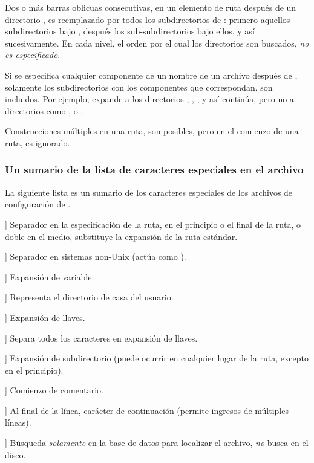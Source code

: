 \documentclass{article}
\begin{document}
Dos o más barras oblicuas consecutivas, en un elemento de ruta después
de un directorio , es reemplazado por todos los subdirectorios
de : primero aquellos subdirectorios bajo , después los
sub-subdirectorios bajo ellos, y así sucesivamente. En cada nivel, el
orden por el cual los directorios son buscados, \emph{no es
especificado}.

Si se especifica cualquier componente de un nombre de un archivo
después de \samp{//}, solamente los subdirectorios con los componentes
que correspondan, son incluidos. Por ejemplo,  expande a
los directorios , , , y así
continúa, pero no a directorios como , o .

Construcciones múltiples \samp{//} en una ruta, son posibles, pero
\samp{//} en el comienzo de una ruta, es ignorado. 

\subsubsection{Un sumario de la lista de caracteres especiales en el archivo }
\label{sec:cnf-special-chars}

La siguiente lista es un sumario de los caracteres especiales de los
archivos de configuración de \KPS{}.

\newcommand{\CODE}[1]{\makebox[3em][l]{\code{#1}}}
\begin{ttdescription}
        \item[\CODE{:}] Separador en la especificación de la ruta, en
            el principio o el final de la ruta, o doble en el medio,
		substituye la expansión de la ruta estándar. \par
	\item[\CODE{;}] Separador en sistemas non-Unix (actúa como
		\code{:}).
	\item[\CODE{\$}] Expansión de variable.
        \item[\CODE{\string~}] Representa el directorio de casa del
            usuario.
	\item[\CODE{\char`\{...\char`\}}] Expansión de llaves.
	\item[\CODE{\,}] Separa todos los caracteres en expansión de llaves.
        \item[\CODE{//}] Expansión de subdirectorio (puede ocurrir en
            cualquier lugar de la ruta, excepto en el principio).
	\item[\CODE{\%}] Comienzo de comentario.
	\item[\CODE{\bs}] Al final de la línea, carácter de continuación
		(permite ingresos de múltiples líneas).
	\item[\CODE{!!}] Búsqueda \emph{solamente} en la base de datos
            para localizar el archivo, \emph{no} busca en el disco.
\end{ttdescription}
\end{document}
